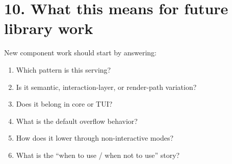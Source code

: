 \section{10. What this means for future library work}\label{record-021-what-this-means-for-future-library-work}

New component work should start by answering:

\begin{enumerate}
\def\labelenumi{\arabic{enumi}.}
\tightlist
\item
  Which pattern is this serving?
\item
  Is it semantic, interaction-layer, or render-path variation?
\item
  Does it belong in core or TUI?
\item
  What is the default overflow behavior?
\item
  How does it lower through non-interactive modes?
\item
  What is the ``when to use / when not to use'' story?
\end{enumerate}

